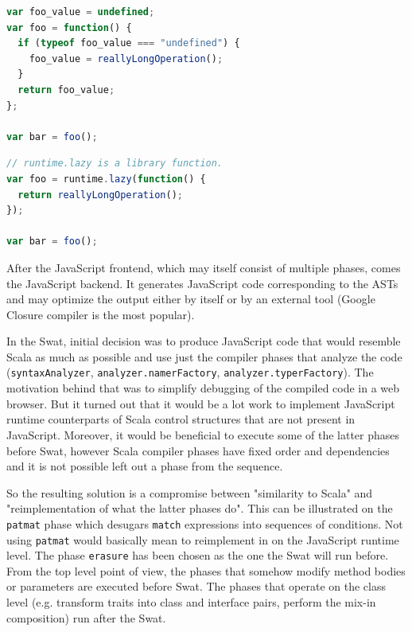 \documentclass[12pt,a4paper]{report}
\begin{document}
\begin{lstlisting}[language=JavaScript,frame=single,caption={Compile-time option outcome.},label={lst:JsCompileTime}]
var foo_value = undefined;
var foo = function() {
  if (typeof foo_value === "undefined") {
    foo_value = reallyLongOperation();
  }
  return foo_value;
};

var bar = foo();
\end{lstlisting}

\begin{lstlisting}[language=JavaScript,frame=single,caption={Runtime option outcome.},label={lst:JsRunTime}]
// runtime.lazy is a library function.
var foo = runtime.lazy(function() {
  return reallyLongOperation();
});

var bar = foo();
\end{lstlisting}

After the JavaScript frontend, which may itself consist of multiple phases, comes the JavaScript backend. It generates JavaScript code corresponding to the ASTs and may optimize the output either by itself or by an external tool (Google Closure compiler\cite{GoogleClosure} is the most popular).

In the Swat, initial decision was to produce JavaScript code that would resemble Scala as much as possible and use just the compiler phases that analyze the code (\texttt{syntaxAnalyzer}, \texttt{analyzer.namerFactory}, \texttt{analyzer.typerFactory}). The motivation behind that was to simplify debugging of the compiled code in a web browser. But it turned out that it would be a lot work to implement JavaScript runtime counterparts of Scala control structures that are not present in JavaScript. Moreover, it would be beneficial to execute some of the latter phases before Swat, however Scala compiler phases have fixed order and dependencies and it is not possible left out a phase from the sequence. 

So the resulting solution is a compromise between "similarity to Scala" and "reimplementation of what the latter phases do". This can be illustrated on the \texttt{patmat} phase which desugars \texttt{match} expressions into sequences of conditions. Not using \texttt{patmat} would basically mean to reimplement in on the JavaScript runtime level. The phase \texttt{erasure} has been chosen as the one the Swat will run before. From the top level point of view, the phases that somehow modify method bodies or parameters are executed before Swat. The phases that operate on the class level (e.g. transform traits into class and interface pairs, perform the mix-in composition) run after the Swat.
\end{document}

